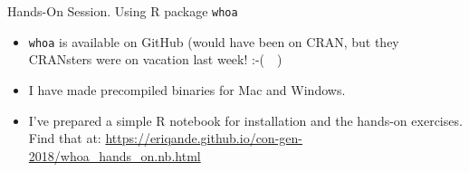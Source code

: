 \documentclass[letter,graphicx]{beamer}
\begin{document}
\begin{frame}{Hands-On Session.  Using R package {\tt whoa}}
\begin{itemize}
\item {\tt whoa} is available on GitHub (would have been on CRAN, but they CRANsters were on vacation last week!  :-(~~)
\item I have made precompiled binaries for Mac and Windows.
\item I've prepared a simple R notebook for installation and the hands-on exercises. Find that at:
 \url{https://eriqande.github.io/con-gen-2018/whoa\_hands\_on.nb.html}
\end{itemize}
\end{frame}
\end{document}
